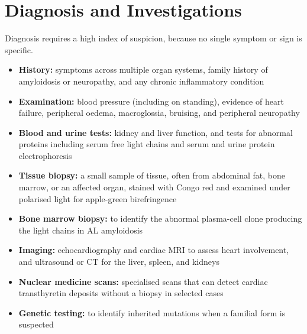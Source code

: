 \section*{Diagnosis and Investigations}
Diagnosis requires a high index of suspicion, because no single symptom or sign is specific.
\begin{itemize}
    \item \textbf{History:} symptoms across multiple organ systems, family history of amyloidosis or neuropathy, and any chronic inflammatory condition
    \item \textbf{Examination:} blood pressure (including on standing), evidence of heart failure, peripheral oedema, macroglossia, bruising, and peripheral neuropathy
    \item \textbf{Blood and urine tests:} kidney and liver function, and tests for abnormal proteins including serum free light chains and serum and urine protein electrophoresis
    \item \textbf{Tissue biopsy:} a small sample of tissue, often from abdominal fat, bone marrow, or an affected organ, stained with Congo red and examined under polarised light for apple-green birefringence
    \item \textbf{Bone marrow biopsy:} to identify the abnormal plasma-cell clone producing the light chains in AL amyloidosis
    \item \textbf{Imaging:} echocardiography and cardiac MRI to assess heart involvement, and ultrasound or CT for the liver, spleen, and kidneys
    \item \textbf{Nuclear medicine scans:} specialised scans that can detect cardiac transthyretin deposits without a biopsy in selected cases
    \item \textbf{Genetic testing:} to identify inherited mutations when a familial form is suspected
\end{itemize}

